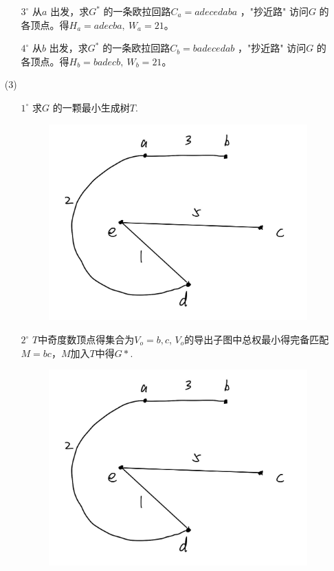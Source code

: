 \documentclass{article}
\begin{document}
\begin{enumerate}
\begin{enumerate}
        \item [$3^\circ$]从$a$ 出发，求$G^* $ 的一条欧拉回路$C_a = adecedaba $ ，"抄近路" 访问$G$ 的各顶点。得$H_a = adecba,\ W_a=21$。
        \item [$4^\circ$]从$b$ 出发，求$G^* $ 的一条欧拉回路$C_b = badecedab $ ，"抄近路" 访问$G$ 的各顶点。得$H_b =badecb,\ W_b=21$。
    \end{enumerate}
    \clearpage
    \item [(3)]
    \begin{enumerate}
        \item [$1^\circ$]求$G$ 的一颗最小生成树$T$.
        \begin{figure}[htbp]
            \centering
            \includegraphics[scale=0.2]{t221.jpg}
        \end{figure}
        \item [$2^\circ$] $T$中奇度数顶点得集合为$V_o = {b ,c }$, 
        $V_o$的导出子图中总权最小得完备匹配$M = {bc}$，$M$加入$T$中得$G*$.
        \begin{figure}[htbp]
            \centering
            \includegraphics[scale=0.2]{t221.jpg}
        \end{figure}


\end{enumerate}
\end{enumerate}
\end{document}
